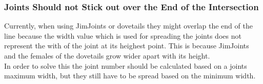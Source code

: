 \documentclass[../ClassicThesis.tex]{subfiles}
\begin{document}
\subsubsection{Joints Should not Stick out over the End of the Intersection}
Currently, when using JimJoints or dovetails they might overlap the end of the line because the width value which is used for spreading the joints does not represent the with of the joint at its heighest point. This is because JimJoints and the females of the dovetails grow wider apart with its height.\\
In order to solve this the joint number should be calculated based on a joints maximum width, but they still have to be spread based on the minimum width.
\end{document}
